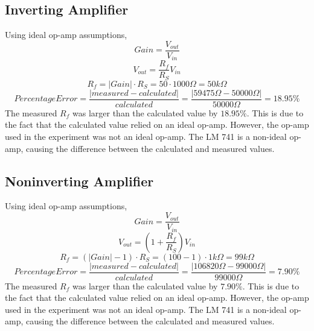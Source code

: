 \documentclass[10pt]{article}
\begin{document}
\subsection*{Inverting Amplifier}
\noindent Using ideal op-amp assumptions,
$$Gain = \frac{V_{out}}{V_{in}}$$
$$V_{out} = \frac{R_f}{R_{S}}V_{in}$$
$$R_f = |Gain| \cdot R_{S} = 50 \cdot 1000\Omega = 50k\Omega$$
$$Percentage Error = \frac{|measured-calculated|}{calculated} = \frac{|59475\Omega-50000\Omega|}{50000\Omega} = 18.95\%$$
\noindent The measured $R_f$ was larger than the calculated value by $18.95\%$. This is due to the fact that the calculated value relied on an ideal op-amp. However, the op-amp used in the experiment was not an ideal op-amp. The LM 741 is a non-ideal op-amp, causing the difference between the calculated and measured values.

\subsection*{Noninverting Amplifier}
\noindent Using ideal op-amp assumptions,
$$Gain = \frac{V_{out}}{V_{in}}$$
$$V_{out} = (1+\frac{R_f}{R_{S}})V_{in}$$
$$R_f = (|Gain|-1)\cdot R_{S} = (100-1)\cdot 1k\Omega = 99k\Omega$$
$$Percentage Error = \frac{|measured-calculated|}{calculated} = \frac{|106820\Omega-99000\Omega|}{99000\Omega} = 7.90\%$$
\noindent The measured $R_f$ was larger than the calculated value by $7.90\%$. This is due to the fact that the calculated value relied on an ideal op-amp. However, the op-amp used in the experiment was not an ideal op-amp. The LM 741 is a non-ideal op-amp, causing the difference between the calculated and measured values.
\end{document}
